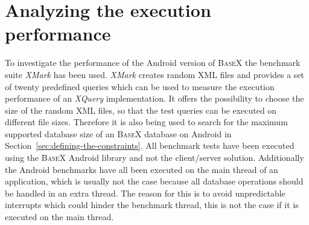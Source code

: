 \section{Analyzing the execution performance}
\label{sec:analysing-the-execution-performance}
To investigate the performance of the Android version of \textsc{BaseX} the benchmark suite \textit{XMark} has been used.
\textit{XMark} creates random XML files and provides a set of twenty predefined queries which can be used to measure the execution performance of an \textit{XQuery} implementation.
It offers the possibility to choose the size of the random XML files, so that the test queries can be executed on different file sizes.
Therefore it is also being used to search for the maximum supported database size of an \textsc{BaseX} database on Android in Section~\ref{sec:defining-the-constraints}.
All benchmark tests have been executed using the \textsc{BaseX} Android library and not the client/server solution.
Additionally the Android benchmarks have all been executed on the main thread of an application, which is usually not the case because all database operations should be handled in an extra thread.
The reason for this is to avoid unpredictable interrupts which could hinder the benchmark thread, this is not the case if it is executed on the main thread.


